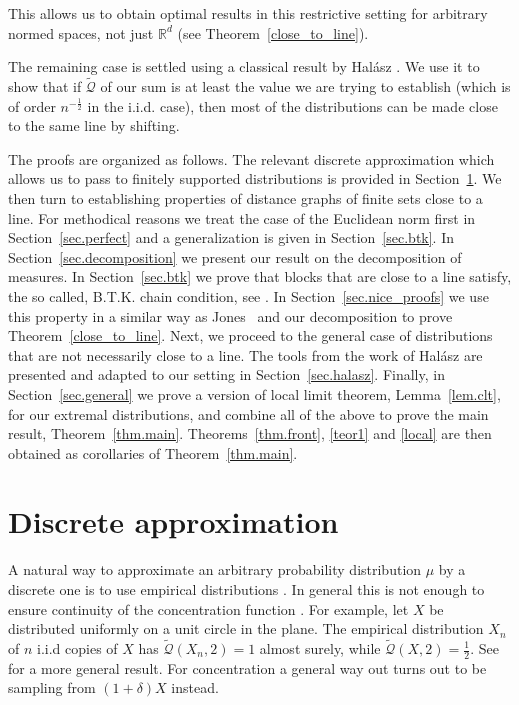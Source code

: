 \documentclass{article}
\newcommand{\concdiam}{\tilde{\mathcal{Q}}}
\begin{document}
This allows us to obtain optimal results in this restrictive setting for arbitrary normed spaces, not just $\mathbb{R}^d$ (see Theorem~\ref{close_to_line}). 

The remaining case is settled using a classical result by Hal{\'a}sz \cite{halasz}. We use it to show that if $\concdiam$ of our sum is at least the value we are trying to establish (which is of order $n^{-\frac 1 2}$ in the i.i.d. case), then most of the distributions can be made close to the same line by shifting.


The proofs are organized as follows. 
The relevant discrete approximation which allows us to pass to finitely supported distributions is provided in Section~\ref{sec.discrete}. We then turn to establishing properties of distance graphs of finite sets close to a line. For methodical reasons we treat the case of the Euclidean norm first in Section~\ref{sec.perfect} and a generalization is given in Section~\ref{sec.btk}.
In Section~\ref{sec.decomposition} we present our result on the decomposition of measures. In Section~\ref{sec.btk} we prove that blocks that are close to a line satisfy, the so called, B.T.K. chain condition, see \cite{btk, jones, LR}. In Section~\ref{sec.nice_proofs} we use this property in a similar way as Jones~\cite{jones} and our decomposition to prove Theorem~\ref{close_to_line}.
Next, we proceed to the general case of distributions that are not necessarily close to a line. The tools from the work of Hal{\'a}sz are presented and adapted to our setting in Section~\ref{sec.halasz}.
Finally, in Section~\ref{sec.general} we prove a version of local limit theorem, Lemma~\ref{lem.clt}, for our extremal distributions,
and combine all of the above to prove the main result, Theorem~\ref{thm.main}. Theorems~\ref{thm.front}, \ref{teor1} and \ref{local} are 
then obtained as corollaries of Theorem~\ref{thm.main}.

\section{Discrete approximation}
\label{sec.discrete}

A natural way to approximate an arbitrary probability distribution $\mu$ by a discrete one is to use
empirical distributions \cite{varadarajan}.
In general this is not enough to ensure continuity of the concentration function \cite{eddyhartigan}.
For example, let $X$ be distributed uniformly on a unit circle in the plane.
The empirical distribution $X_n$ of $n$ i.i.d copies of $X$ has $\concdiam(X_n, 2)=1$ almost surely,
while $\concdiam(X, 2) = \frac 1 2$. See \cite{eddyhartigan} for a more general result. For concentration
a general way out turns out to be sampling from $(1+\delta) X$ instead.
\end{document}
